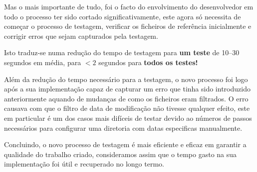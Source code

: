 Mas o mais importante de tudo, foi o facto do envolvimento do desenvolvedor
em todo o processo ter sido cortado significativamente, este agora só necessita
de começar o processo de testagem, verificar os ficheiros de referência
inicialmente e corrigir erros que sejam capturados pela testagem.

Isto traduz-se numa redução do tempo de testagem para \textbf{um teste} de
\numrange{10}{30} segundos em média, para $< 2$ segundos para
\textbf{todos os testes!}

Além da redução do tempo necessário para a testagem, o novo processo foi logo
após a sua implementação capaz de capturar um erro que tinha sido introduzido
anteriormente aquando de mudanças de como os ficheiros eram filtrados. O erro
causava com que o filtro de data de modificação não tivesse qualquer efeito,
este em particular é um dos casos mais difíceis de testar devido ao números de
passos necessários para configurar uma diretoria com datas especificas manualmente.

Concluindo, o novo processo de testagem é mais eficiente e eficaz em garantir
a qualidade do trabalho criado, consideramos assim que o tempo gasto na sua
implementação foi útil e recuperado no longo termo.
